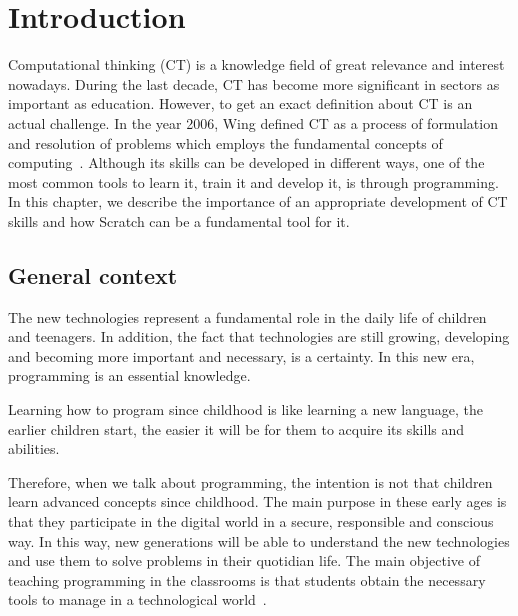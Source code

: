 

\cleardoublepage
\chapter{Introduction}
\label{sec:intro}

Computational thinking (CT) is a knowledge field of great relevance and interest nowadays. During the last decade, CT has become more significant in sectors as important as education. However, to get an exact definition about CT is an actual challenge. In the year 2006, Wing defined CT as a process of formulation and resolution of problems which employs the fundamental concepts of computing~\cite{wing:_ct}. Although its skills can be developed in different ways, one of the most common tools to learn it, train it and develop it, is through programming. In this chapter, we describe the importance of an appropriate development of CT skills and how Scratch can be a fundamental tool for it. 


\section{General context}
\label{sec:context}

The new technologies represent a fundamental role in the daily life of children and teenagers. In addition, the fact that technologies are still growing, developing and becoming more important and necessary, is a certainty. In this new era, programming is an essential knowledge. 

Learning how to program since childhood is like learning a new language, the earlier children start, the easier it will be for them to acquire its skills and abilities.

Therefore, when we talk about programming, the intention is not that children learn advanced concepts since childhood. The main purpose in these early ages is that they participate in the digital world in a secure, responsible and conscious way. In this way, new generations will be able to understand the new technologies and use them to solve problems in their quotidian life. The main objective of teaching programming in the classrooms is that students obtain the necessary tools to manage in a technological world~\cite{mangifesta:_importancia}. 

